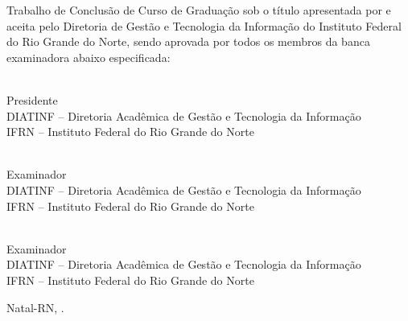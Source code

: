 \begin{folhadeaprovacao}
	\setlength{\ABNTsignthickness}{0.4pt}
	\setlength{\ABNTsignwidth}{10cm}

	\noindent
	Trabalho de Conclusão de Curso de Graduação sob o título
	\textit{\myThesis} apresentada por \myName{ }e aceita pelo Diretoria
	de Gestão e Tecnologia da Informação do Instituto Federal do Rio Grande do
	Norte, sendo aprovada por todos os membros da banca examinadora abaixo especificada:

	\assinatura
	{
	{\mySupervisorName}   			                  \\
	{\small Presidente}											          \smallskip\\
	{\footnotesize
	DIATINF -- Diretoria Acadêmica de Gestão e Tecnologia da Informação		   \\
	IFRN -- Instituto Federal do Rio Grande do Norte
	}
	}

	\assinatura
	{
	\myFirstExaminerName   			                  \\
	{\small Examinador}											          \smallskip\\
	{\footnotesize
	DIATINF -- Diretoria Acadêmica de Gestão e Tecnologia da Informação		   \\
	IFRN -- Instituto Federal do Rio Grande do Norte
	}
	}

	\assinatura
	{
	\mySecondExaminerName   			                  \\
	{\small Examinador}											          \smallskip\\
	{\footnotesize
	DIATINF -- Diretoria Acadêmica de Gestão e Tecnologia da Informação		   \\
	IFRN -- Instituto Federal do Rio Grande do Norte
	}
	}

	\vfill

	\begin{center}
		Natal-RN, \myDefenseDate.
	\end{center}
\end{folhadeaprovacao}
